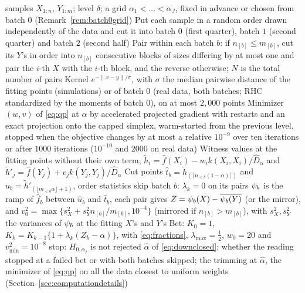\begin{algorithm}[!tb]
\caption{The split-sample lower bound $\widehat\alpha$, with the defaults of our runs}
\label{alg:split}
\begin{algorithmic}[1]
\Require samples $X_{1:n}$, $Y_{1:m}$; level $\delta$; a grid $\alpha_1<\dots<\alpha_J$, fixed in advance or chosen from
batch $0$ (Remark~\ref{rem:batch0grid})
\State Put each sample in a random order drawn independently of the data and cut it into batch $0$ (first quarter),
batch $1$ (second quarter) and batch $2$ (second half)
\State Pair within each batch $b$: if $n_{[b]}\le m_{[b]}$, cut its $Y$'s in order into $n_{[b]}$ consecutive blocks of
sizes differing by at most one and pair the $i$-th $X$ with the $i$-th block, and the reverse otherwise; $N$ is the
total number of pairs
\State Kernel $e^{-\|x-y\|/\sigma}$, with $\sigma$ the median pairwise distance of the fitting points (simulations) or
of batch $0$ (real data, both batches; RHC standardized by the moments of batch $0$), on at most $2{,}000$ points
\State Minimizer $(w,v)$ of \eqref{eq:qp} at $\alpha$ by accelerated projected gradient with restarts and an exact
projection onto the capped simplex, warm-started from the previous level, stopped when the objective changes by at most
a relative $10^{-9}$ over ten iterations or after $1000$ iterations ($10^{-10}$ and $2000$ on real data)
\State Witness values at the fitting points without their own term, $\tilde h_i=\widehat f(X_i)-w_ik(X_i,X_i)/\widehat D_\alpha$
and $\tilde h'_j=\widehat f(Y_j)+v_jk(Y_j,Y_j)/\widehat D_\alpha$
\State Cut points $\widehat t_b=\tilde h_{(\lceil n_{<b}(1-\alpha)\rceil)}$ and $\widehat u_b=\tilde h'_{(\lfloor m_{<b}\alpha\rfloor+1)}$,
order statistics
 skip batch $b$: $\lambda_k=0$ on its pairs
\Else{} $\psi_b$ is the ramp of $\widehat f_b$ between $\widehat u_b$ and $\widehat t_b$, each pair gives
$Z=\psi_b(X)-\overline{\psi_b(Y)}$ (or the mirror), and $v_0^2=\max\{s_X^2+s_Y^2n_{[b]}/m_{[b]},10^{-4}\}$ (mirrored
if $n_{[b]}>m_{[b]}$), with $s_X^2,s_Y^2$ the variances of $\psi_b$ at the fitting $X$'s and $Y$'s
\EndIf
\EndFor
\State Bet: $K_0=1$, $K_k=K_{k-1}\{1+\lambda_k(Z_k-\alpha)\}$, with \eqref{eq:fractions}, $\lambda_{\max}=\tfrac12$,
$w_0=20$ and $v^2_{\min}=10^{-8}$
 stop: $H_{0,\alpha_j}$ is not rejected \EndIf
\EndFor
\State \Return $\widehat\alpha$ of \eqref{eq:downclosed}; whether the reading stopped at a failed bet or with both batches
skipped; the trimming at $\widehat\alpha$, the minimizer of \eqref{eq:qp} on all the data closest to uniform weights
(Section~\ref{sec:computationdetails})
\end{algorithmic}
\end{algorithm}


